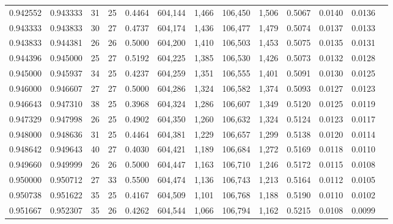 \begin{tabular}{rrrrrrrrrrrrr}
0.942552 & 0.943333 &    31 &  25 &                                     0.4464 & 604,144 &   1,466 & 106,450 &   1,506 & 0.5067 & 0.0140 & 0.0136 \\
0.943333 & 0.943833 &    30 &  27 &                                     0.4737 & 604,174 &   1,436 & 106,477 &   1,479 & 0.5074 & 0.0137 & 0.0133 \\
0.943833 & 0.944381 &    26 &  26 &                                     0.5000 & 604,200 &   1,410 & 106,503 &   1,453 & 0.5075 & 0.0135 & 0.0131 \\
0.944396 & 0.945000 &    25 &  27 &                                     0.5192 & 604,225 &   1,385 & 106,530 &   1,426 & 0.5073 & 0.0132 & 0.0128 \\
0.945000 & 0.945937 &    34 &  25 &                                     0.4237 & 604,259 &   1,351 & 106,555 &   1,401 & 0.5091 & 0.0130 & 0.0125 \\
0.946000 & 0.946607 &    27 &  27 &                                     0.5000 & 604,286 &   1,324 & 106,582 &   1,374 & 0.5093 & 0.0127 & 0.0123 \\
0.946643 & 0.947310 &    38 &  25 &                                     0.3968 & 604,324 &   1,286 & 106,607 &   1,349 & 0.5120 & 0.0125 & 0.0119 \\
0.947329 & 0.947998 &    26 &  25 &                                     0.4902 & 604,350 &   1,260 & 106,632 &   1,324 & 0.5124 & 0.0123 & 0.0117 \\
0.948000 & 0.948636 &    31 &  25 &                                     0.4464 & 604,381 &   1,229 & 106,657 &   1,299 & 0.5138 & 0.0120 & 0.0114 \\
0.948642 & 0.949643 &    40 &  27 &                                     0.4030 & 604,421 &   1,189 & 106,684 &   1,272 & 0.5169 & 0.0118 & 0.0110 \\
0.949660 & 0.949999 &    26 &  26 &                                     0.5000 & 604,447 &   1,163 & 106,710 &   1,246 & 0.5172 & 0.0115 & 0.0108 \\
0.950000 & 0.950712 &    27 &  33 &                                     0.5500 & 604,474 &   1,136 & 106,743 &   1,213 & 0.5164 & 0.0112 & 0.0105 \\
0.950738 & 0.951622 &    35 &  25 &                                     0.4167 & 604,509 &   1,101 & 106,768 &   1,188 & 0.5190 & 0.0110 & 0.0102 \\
0.951667 & 0.952307 &    35 &  26 &                                     0.4262 & 604,544 &   1,066 & 106,794 &   1,162 & 0.5215 & 0.0108 & 0.0099 \\

\end{tabular}
